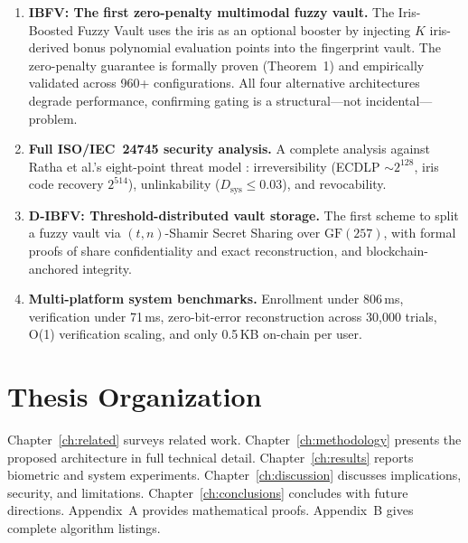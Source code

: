 \begin{enumerate}
  \item \textbf{IBFV: The first zero-penalty multimodal fuzzy vault.} The
  Iris-Boosted Fuzzy Vault uses the iris as an optional booster by injecting $K$
  iris-derived bonus polynomial evaluation points into the fingerprint vault.
  The zero-penalty guarantee is formally proven (Theorem~1) and empirically
  validated across 960+ configurations. All four alternative architectures degrade
  performance, confirming gating is a structural---not incidental---problem.

  \item \textbf{Full ISO/IEC~24745 security analysis.} A complete analysis against
  Ratha et al.'s eight-point threat model \cite{ratha2001enhancing}: irreversibility
  (ECDLP $\sim\!2^{128}$, iris code recovery $2^{514}$), unlinkability
  ($D_{\mathrm{sys}} \leq 0.03$), and revocability.

  \item \textbf{D-IBFV: Threshold-distributed vault storage.} The first scheme to
  split a fuzzy vault via $(t,n)$-Shamir Secret Sharing over $\mathrm{GF}(257)$,
  with formal proofs of share confidentiality and exact reconstruction, and
  blockchain-anchored integrity.

  \item \textbf{Multi-platform system benchmarks.} Enrollment under 806\,ms,
  verification under 71\,ms, zero-bit-error reconstruction across 30{,}000 trials,
  O(1) verification scaling, and only 0.5\,KB on-chain per user.
\end{enumerate}

\section{Thesis Organization}

Chapter~\ref{ch:related} surveys related work. Chapter~\ref{ch:methodology}
presents the proposed architecture in full technical detail. Chapter~\ref{ch:results}
reports biometric and system experiments. Chapter~\ref{ch:discussion} discusses
implications, security, and limitations. Chapter~\ref{ch:conclusions} concludes
with future directions. Appendix~A provides mathematical proofs.
Appendix~B gives complete algorithm listings.

